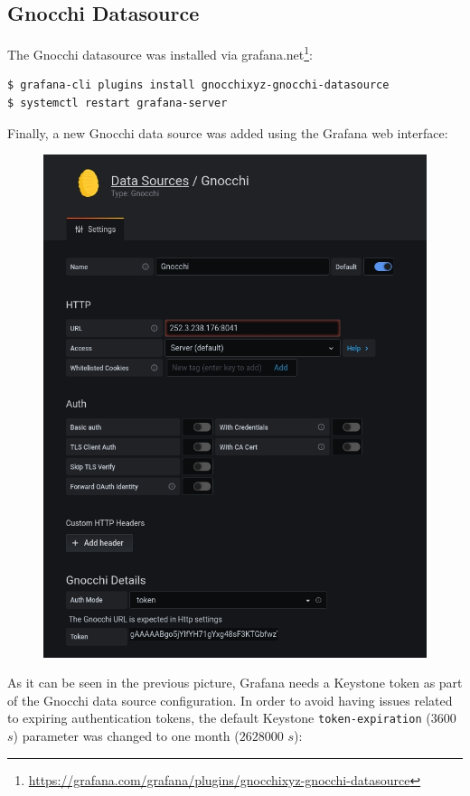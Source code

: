 \documentclass[11pt,a4paper]{article}
\begin{document}
\subsection{Gnocchi Datasource}
The Gnocchi datasource was installed via grafana.net\footnote{\url{https://grafana.com/grafana/plugins/gnocchixyz-gnocchi-datasource}}:
\begin{lstlisting}[]
$ grafana-cli plugins install gnocchixyz-gnocchi-datasource
$ systemctl restart grafana-server
\end{lstlisting}
Finally, a new Gnocchi data source was added using the Grafana web interface:
\begin{figure}[H]
    \centering
    \includegraphics[scale=0.65]{imgs/grafana-gnocchi-datasource.jpg}
\end{figure}
\noindent
As it can be seen in the previous picture, Grafana needs a Keystone token as part of the Gnocchi data source configuration. In order to avoid having issues related to expiring authentication tokens, the default Keystone \texttt{token-expiration} ($3600$ $s$) parameter was changed to one month ($2628000$ $s$):
\end{document}
